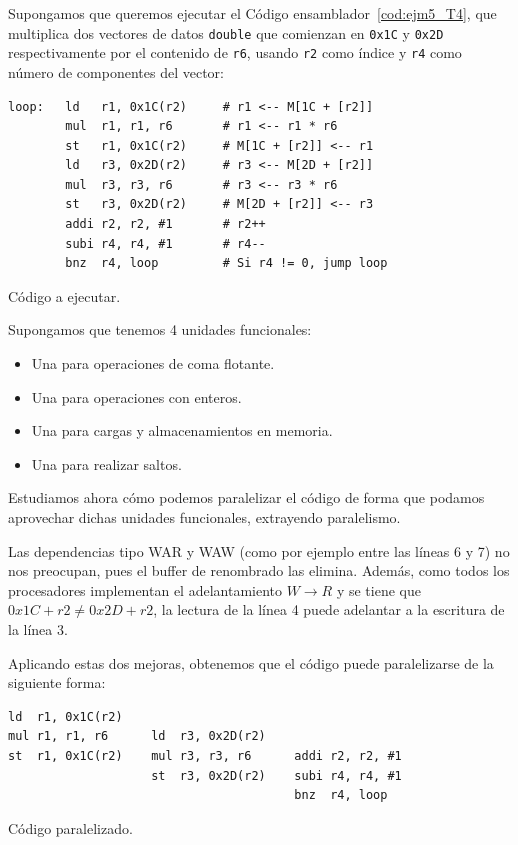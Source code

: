 \begin{ejemplo}
    Supongamos que queremos ejecutar el Código ensamblador~\ref{cod:ejm5_T4}, que multiplica dos vectores de datos \verb|double| que comienzan en \verb|0x1C| y \verb|0x2D| respectivamente por el contenido de \verb|r6|, usando \verb|r2| como índice y \verb|r4| como número de componentes del vector:\\
    \begin{listing}[H]
    \begin{verbatim}
loop:   ld   r1, 0x1C(r2)     # r1 <-- M[1C + [r2]]
        mul  r1, r1, r6       # r1 <-- r1 * r6
        st   r1, 0x1C(r2)     # M[1C + [r2]] <-- r1
        ld   r3, 0x2D(r2)     # r3 <-- M[2D + [r2]]
        mul  r3, r3, r6       # r3 <-- r3 * r6
        st   r3, 0x2D(r2)     # M[2D + [r2]] <-- r3
        addi r2, r2, #1       # r2++
        subi r4, r4, #1       # r4--
        bnz  r4, loop         # Si r4 != 0, jump loop
    \end{verbatim}
    \caption{Código a ejecutar.}
    \label{cod:ejm5_T4}
    \end{listing}

    Supongamos que tenemos 4 unidades funcionales: 
    \begin{itemize}
        \item Una para operaciones de coma flotante.
        \item Una para operaciones con enteros.
        \item Una para cargas y almacenamientos en memoria.
        \item Una para realizar saltos.
    \end{itemize}
    Estudiamos ahora cómo podemos paralelizar el código de forma que podamos aprovechar dichas unidades funcionales, extrayendo paralelismo.

    Las dependencias tipo WAR y WAW (como por ejemplo entre las líneas 6 y 7) no nos preocupan, pues el buffer de renombrado las elimina. Además, como todos los procesadores implementan el adelantamiento $W\rightarrow R$ y se tiene que $0x1C + r2 \neq 0x2D + r2$, la lectura de la línea 4 puede adelantar a la escritura de la línea 3. 

    Aplicando estas dos mejoras, obtenemos que el código puede paralelizarse de la siguiente forma:\\
    \begin{listing}[H]
    \begin{verbatim}
ld  r1, 0x1C(r2)
mul r1, r1, r6      ld  r3, 0x2D(r2)
st  r1, 0x1C(r2)    mul r3, r3, r6      addi r2, r2, #1
                    st  r3, 0x2D(r2)    subi r4, r4, #1
                                        bnz  r4, loop
    \end{verbatim}
    \caption{Código paralelizado.}
    \label{cod:ejm4_T4_paralelizado}
    \end{listing}


\end{ejemplo}
